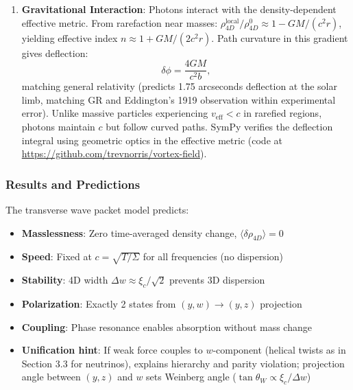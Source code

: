 \begin{enumerate}
\item \textbf{Gravitational Interaction}: Photons interact with the density-dependent effective metric. From rarefaction near masses: $\rho_{4D}^{\text{local}}/\rho_{4D}^0 \approx 1 - GM/(c^2r)$, yielding effective index $n \approx 1 + GM/(2c^2r)$. Path curvature in this gradient gives deflection:
   \[
   \delta\phi = \frac{4GM}{c^2b},
   \]
   matching general relativity (predicts 1.75 arcseconds deflection at the solar limb, matching GR and Eddington's 1919 observation within experimental error). Unlike massive particles experiencing $v_{\text{eff}} < c$ in rarefied regions, photons maintain $c$ but follow curved paths. SymPy verifies the deflection integral using geometric optics in the effective metric (code at \url{https://github.com/trevnorris/vortex-field}).
\end{enumerate}

\subsubsection{Results and Predictions}
The transverse wave packet model predicts:
\begin{itemize}
\item \textbf{Masslessness}: Zero time-averaged density change, $\langle\delta\rho_{4D}\rangle = 0$
\item \textbf{Speed}: Fixed at $c = \sqrt{T/\Sigma}$ for all frequencies (no dispersion)
\item \textbf{Stability}: 4D width $\Delta w \approx \xi_c / \sqrt{2}$ prevents 3D dispersion
\item \textbf{Polarization}: Exactly 2 states from $(y,w) \to (y,z)$ projection
\item \textbf{Coupling}: Phase resonance enables absorption without mass change
\item \textbf{Unification hint}: If weak force couples to $w$-component (helical twists as in Section 3.3 for neutrinos), explains hierarchy and parity violation; projection angle between $(y,z)$ and $w$ sets Weinberg angle ($\tan\theta_W \propto \xi_c/\Delta w$)
\end{itemize}




